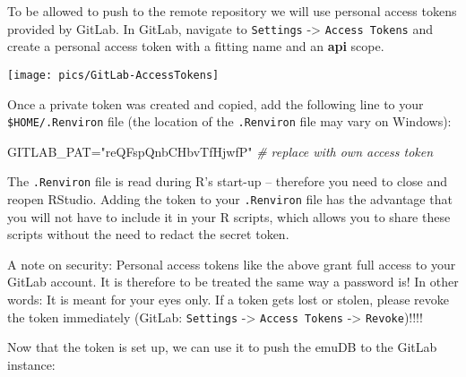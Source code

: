\documentclass[
]{book}
\newenvironment{Shaded}{\begin{snugshade}}{\end{snugshade}}
\newcommand{\AttributeTok}[1]{\textcolor[rgb]{0.77,0.63,0.00}{#1}}
\newcommand{\CommentTok}[1]{\textcolor[rgb]{0.56,0.35,0.01}{\textit{#1}}}
\newcommand{\ConstantTok}[1]{\textcolor[rgb]{0.00,0.00,0.00}{#1}}
\newcommand{\FunctionTok}[1]{\textcolor[rgb]{0.00,0.00,0.00}{#1}}
\newcommand{\NormalTok}[1]{#1}
\newcommand{\OtherTok}[1]{\textcolor[rgb]{0.56,0.35,0.01}{#1}}
\newcommand{\SpecialCharTok}[1]{\textcolor[rgb]{0.00,0.00,0.00}{#1}}
\newcommand{\StringTok}[1]{\textcolor[rgb]{0.31,0.60,0.02}{#1}}
\begin{document}
To be allowed to push to the remote repository we will use personal access tokens provided by GitLab. In GitLab, navigate to \texttt{Settings} -\textgreater{} \texttt{Access\ Tokens} and create a personal access token with a fitting name and an \textbf{api} scope.

\begin{center}\texttt{[image: pics/GitLab-AccessTokens]} \end{center}

Once a private token was created and copied, add the following line to your \texttt{\$HOME/.Renviron} file (the location of the \texttt{.Renviron} file may vary on Windows):

\begin{Shaded}
\begin{Highlighting}[]
\NormalTok{GITLAB\_PAT}\OtherTok{=}\StringTok{"reQFspQnbCHbvTfHjwfP"} \CommentTok{\# replace with own access token}
\end{Highlighting}
\end{Shaded}

The \texttt{.Renviron} file is read during R's start-up -- therefore you need to close and reopen RStudio. Adding the token to your \texttt{.Renviron} file has the advantage that you will not have to include it in your R scripts, which allows you to share these scripts without the need to redact the secret token.

A note on security: Personal access tokens like the above grant full access to your GitLab account. It is therefore to be treated the same way a password is! In other words: It is meant for your eyes only. If a token gets lost or stolen, please revoke the token immediately (GitLab: \texttt{Settings} -\textgreater{} \texttt{Access\ Tokens} -\textgreater{} \texttt{Revoke})!!!!

Now that the token is set up, we can use it to push the emuDB to the GitLab instance:

\begin{Shaded}
\end{Shaded}
\end{document}
